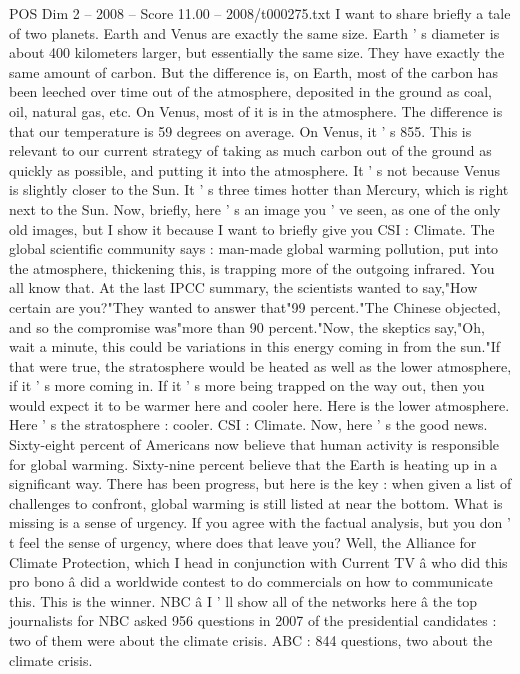 \begin{textsample}{POS Dim 2 – 2008 – Score 11.00 – 2008/t000275.txt}
I want to share briefly a tale of two planets.
Earth and Venus are exactly the same size.
Earth ' s diameter is about 400 kilometers larger, but essentially the same size.
They have exactly the same amount of carbon.
But the difference is, on Earth, most of the carbon has been leeched over time out of the atmosphere, deposited in the ground as coal, oil, natural gas, etc.
On Venus, most of it is in the atmosphere.
The difference is that our temperature is 59 degrees on average.
On Venus, it ' s 855.
This is relevant to our current strategy of taking as much carbon out of the ground as quickly as possible, and putting it into the atmosphere.
It ' s not because Venus is slightly closer to the Sun.
It ' s three times hotter than Mercury, which is right next to the Sun.
Now, briefly, here ' s an image you ' ve seen, as one of the only old images, but I show it because I want to briefly give you CSI : Climate.
The global scientific community says : man-made global warming pollution, put into the atmosphere, thickening this, is trapping more of the outgoing infrared.
You all know that.
At the last IPCC summary, the scientists wanted to say,"How certain are you?"They wanted to answer that"99 percent."The Chinese objected, and so the compromise was"more than 90 percent."Now, the skeptics say,"Oh, wait a minute, this could be variations in this energy coming in from the sun."If that were true, the stratosphere would be heated as well as the lower atmosphere, if it ' s more coming in.
If it ' s more being trapped on the way out, then you would expect it to be warmer here and cooler here.
Here is the lower atmosphere.
Here ' s the stratosphere : cooler.
CSI : Climate.
Now, here ' s the good news.
Sixty-eight percent of Americans now believe that human activity is responsible for global warming.
Sixty-nine percent believe that the Earth is heating up in a significant way.
There has been progress, but here is the key : when given a list of challenges to confront, global warming is still listed at near the bottom.
What is missing is a sense of urgency.
If you agree with the factual analysis, but you don ' t feel the sense of urgency, where does that leave you?
Well, the Alliance for Climate Protection, which I head in conjunction with Current TV â who did this pro bono â did a worldwide contest to do commercials on how to communicate this.
This is the winner.
NBC â I ' ll show all of the networks here â the top journalists for NBC asked 956 questions in 2007 of the presidential candidates : two of them were about the climate crisis.
ABC : 844 questions, two about the climate crisis.

\end{textsample}
